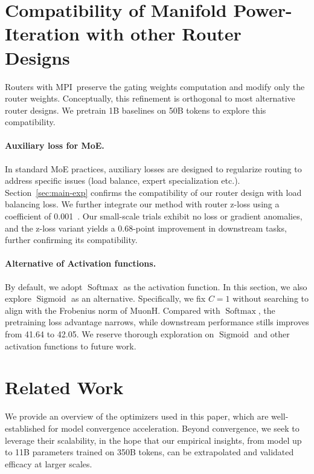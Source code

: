 \documentclass{llmxive}
\providecommand{\name}{MPI}
\begin{document}
\section{Compatibility of Manifold Power-\- Iteration with other Router Designs}
\label{sec:compatibility}
Routers with \name\ preserve the gating weights computation and modify only the router weights. 
Conceptually, this refinement is orthogonal to most alternative router designs.
We pretrain 1B baselines on 50B tokens to explore this compatibility.

\paragraph{Auxiliary loss for MoE.}
In standard MoE practices, auxiliary losses are designed to regularize routing to address specific issues (load balance, expert specialization etc.).
Section~\ref{sec:main-exp} confirms the compatibility of our router design with load balancing loss.
We further integrate our method with router z-loss using a coefficient of 0.001~\cite{zloss}. 
Our small-scale trials exhibit no loss or gradient anomalies, and the z-loss variant yields a 0.68-point improvement in downstream tasks, further confirming its compatibility.

\paragraph{Alternative of Activation functions.}
By default, we adopt $\operatorname{Softmax}$ as the activation function.
In this section, we also explore $\operatorname{Sigmoid}$ as an alternative.
Specifically, we fix $C=1$ without searching to align with the Frobenius norm of MuonH.
Compared with $\operatorname{Softmax}$, the pretraining loss advantage narrows, while downstream performance stills improves from 41.64 to 42.05.
We reserve thorough exploration on $\operatorname{Sigmoid}$ and other activation functions to future work.

\section{Related Work}
\label{sec:related}
We provide an overview of the optimizers used in this paper, which are well-established for model convergence acceleration.
Beyond convergence, we seek to leverage their scalability,
in the hope that our empirical insights, from model up to 11B parameters trained on 350B tokens, can be extrapolated and validated efficacy at larger scales.
\end{document}
